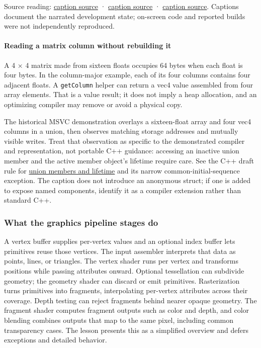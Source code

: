 Source reading: \href{https://www.youtube.com/watch?v=70q9jtjWP4o}{caption source} · \href{https://www.youtube.com/watch?v=4M1hKSFxhWw}{caption source} · \href{https://www.youtube.com/watch?v=Is6CwlsaCFE}{caption source}. Captions document the narrated development state; on-screen code and reported builds were not independently reproduced.

\paragraph{Reading a matrix column without rebuilding it}\label{06-engine-ii-ch025-reading-a-matrix-column-without-rebuilding-it}

A 4 × 4 matrix made from sixteen floats occupies 64 bytes when each float is four bytes. In the column-major example, each of its four columns contains four adjacent floats. A \texttt{getColumn} helper can return a vec4 value assembled from four array elements. That is a value result; it does not imply a heap allocation, and an optimizing compiler may remove or avoid a physical copy.

The historical MSVC demonstration overlays a sixteen-float array and four vec4 columns in a union, then observes matching storage addresses and mutually visible writes. Treat that observation as specific to the demonstrated compiler and representation, not portable C++ guidance: accessing an inactive union member and the active member object's lifetime require care. See the C++ draft rule for \href{https://eel.is/c++draft/class.union}{union members and lifetime} and its narrow common-initial-sequence exception. The caption does not introduce an anonymous struct; if one is added to expose named components, identify it as a compiler extension rather than standard C++.

\subsubsection{What the graphics pipeline stages do}\label{06-engine-ii-ch025-what-the-graphics-pipeline-stages-do}

A vertex buffer supplies per-vertex values and an optional index buffer lets primitives reuse those vertices. The input assembler interprets that data as points, lines, or triangles. The vertex shader runs per vertex and transforms positions while passing attributes onward. Optional tessellation can subdivide geometry; the geometry shader can discard or emit primitives. Rasterization turns primitives into fragments, interpolating per-vertex attributes across their coverage. Depth testing can reject fragments behind nearer opaque geometry. The fragment shader computes fragment outputs such as color and depth, and color blending combines outputs that map to the same pixel, including common transparency cases. The lesson presents this as a simplified overview and defers exceptions and detailed behavior.

